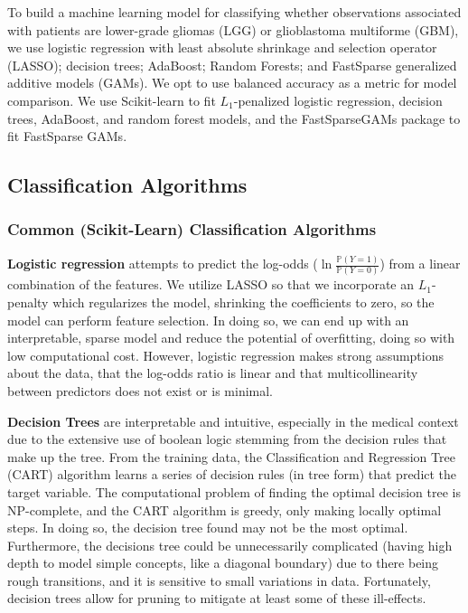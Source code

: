 \documentclass[12pt]{article}
\newtheorem{Proof of Lemma}{Proof of Lemma}
\begin{document}
To build a machine learning model for classifying whether observations associated with patients are lower-grade 
gliomas (LGG) or glioblastoma multiforme (GBM), we use logistic regression with least absolute shrinkage and 
selection operator (LASSO); decision trees; AdaBoost; Random Forests; and FastSparse generalized additive models (GAMs). We opt to use balanced accuracy 
as a metric for model comparison. We use Scikit-learn to fit $L_1$-penalized logistic regression, decision trees, AdaBoost,
and random forest models, and the FastSparseGAMs package to fit FastSparse GAMs. 

\subsection{Classification Algorithms}
\subsubsection{Common (Scikit-Learn) Classification Algorithms}
\textbf{Logistic regression} attempts to predict the log-odds ($\ln\frac{\mathbb{P}(Y=1)}{\mathbb{P}(Y=0)}$) from a linear combination
of the features. We utilize LASSO so that we incorporate an $L_1$-penalty which regularizes the model, shrinking the coefficients 
to zero, so the model can perform feature selection. In doing so, we can end up with an interpretable, sparse model and reduce the 
potential of overfitting, doing so with low computational cost. However, logistic regression makes strong assumptions about the data, 
that the log-odds ratio is linear and that multicollinearity between predictors does not exist or is minimal. 

\textbf{Decision Trees} are interpretable and intuitive, especially in the medical context due to the extensive use of
boolean logic stemming from the decision rules that make up the tree. From the training data, the 
Classification and Regression Tree (CART) algorithm learns a series of decision rules (in tree form) that predict the 
target variable. The computational problem of finding the optimal decision tree is NP-complete, and the CART algorithm
is greedy, only making locally optimal steps. In doing so, the decision tree found may not be the most optimal. Furthermore,
the decisions tree could be unnecessarily complicated (having high depth to model simple concepts, like a diagonal boundary)
due to there being rough transitions, and it is sensitive to small variations in data. Fortunately, decision trees allow for 
pruning to mitigate at least some of these ill-effects. 
\end{document}
